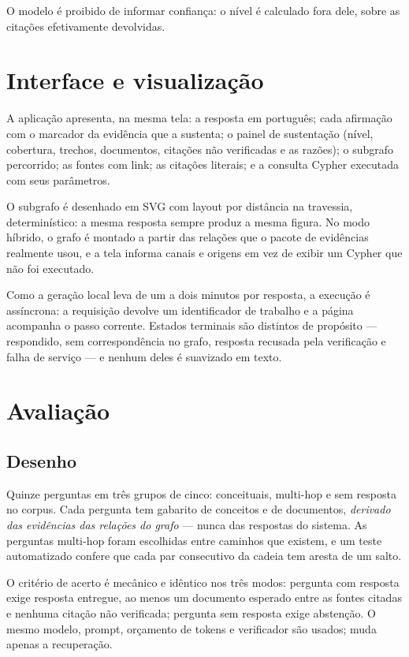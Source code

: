 \documentclass[12pt]{article}
\begin{document}
O modelo é proibido de informar confiança: o nível é calculado fora dele, sobre as citações
efetivamente devolvidas.

\section{Interface e visualização}

A aplicação apresenta, na mesma tela: a resposta em português; cada afirmação com o marcador da
evidência que a sustenta; o painel de sustentação (nível, cobertura, trechos, documentos, citações
não verificadas e as razões); o subgrafo percorrido; as fontes com link; as citações literais; e a
consulta Cypher executada com seus parâmetros.

O subgrafo é desenhado em SVG com layout por distância na travessia, determinístico: a mesma
resposta sempre produz a mesma figura. No modo híbrido, o grafo é montado a partir das relações que
o pacote de evidências realmente usou, e a tela informa canais e origens em vez de exibir um
Cypher que não foi executado.

Como a geração local leva de um a dois minutos por resposta, a execução é assíncrona: a requisição
devolve um identificador de trabalho e a página acompanha o passo corrente. Estados terminais são
distintos de propósito --- respondido, sem correspondência no grafo, resposta recusada pela
verificação e falha de serviço --- e nenhum deles é suavizado em texto.

\section{Avaliação}

\subsection{Desenho}

Quinze perguntas em três grupos de cinco: conceituais, multi-hop e sem resposta no corpus. Cada
pergunta tem gabarito de conceitos e de documentos, \emph{derivado das evidências das relações do
grafo} --- nunca das respostas do sistema. As perguntas multi-hop foram escolhidas entre caminhos
que existem, e um teste automatizado confere que cada par consecutivo da cadeia tem aresta de um
salto.

O critério de acerto é mecânico e idêntico nos três modos: pergunta com resposta exige resposta
entregue, ao menos um documento esperado entre as fontes citadas e nenhuma citação não verificada;
pergunta sem resposta exige abstenção. O mesmo modelo, prompt, orçamento de tokens e verificador
são usados; muda apenas a recuperação.
\end{document}
